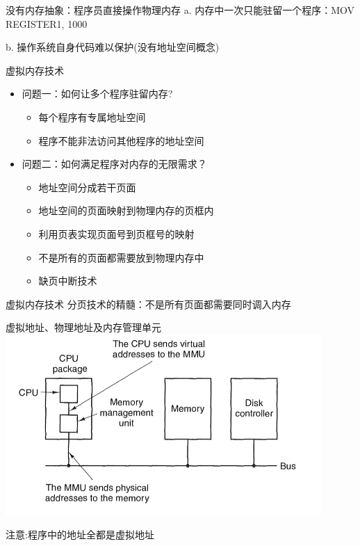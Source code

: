 \documentclass[xcolor=svgnames]{beamer}
\begin{document}
\begin{CJK*}{UTF8}{gbsn}
\begin{frame}{没有内存抽象：程序员直接操作物理内存}
a. 内存中一次只能驻留一个程序：\alert{MOV REGISTER1, 1000}

b. 操作系统自身代码难以保护(没有地址空间概念)
\end{frame}

\begin{frame}{虚拟内存技术}
\begin{itemize}
\item 问题一：如何让多个程序驻留内存?
\begin{itemize}
\item 每个程序有专属地址空间
\item 程序不能非法访问其他程序的地址空间
\end{itemize}
\item 问题二：如何满足程序对内存的无限需求？
\begin{itemize}
\item 地址空间分成若干\alert{页面}
\item 地址空间的页面映射到物理内存的\alert{页框}内
\item 利用\alert{页表}实现页面号到页框号的映射
\item 不是所有的页面都需要放到物理内存中
\item 缺页中断技术
\end{itemize}
\end{itemize}
\end{frame}

\begin{frame}{虚拟内存技术}
分页技术的精髓：不是所有页面都需要同时调入内存
\end{frame}

\begin{frame}{虚拟地址、物理地址及内存管理单元}
\includegraphics[width=0.9\textwidth]{mmu.png}

\alert{注意}:程序中的地址全都是虚拟地址
\end{frame}


\end{CJK*}
\end{document}
